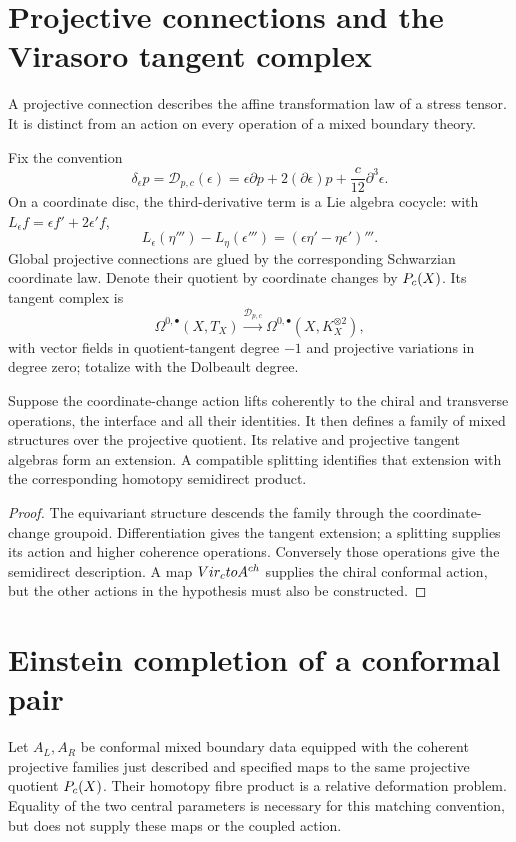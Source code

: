 \section{Projective connections and the Virasoro tangent complex}
A projective connection describes the affine transformation law of a
stress tensor. It is distinct from an action on every operation of a mixed
boundary theory.

Fix the convention
\[
 \delta_\epsilon p=\mathcal D_{p,c}(\epsilon)
   =\epsilon\partial p+2(\partial\epsilon)p+\frac c{12}\partial^3\epsilon.
\]
On a coordinate disc, the third-derivative term is a Lie algebra cocycle:
with $L_\epsilon f=\epsilon f'+2\epsilon'f$,
\[
 L_\epsilon(\eta''')-L_\eta(\epsilon''')
   =(\epsilon\eta'-\eta\epsilon')'''.
\]
Global projective connections are glued by the corresponding Schwarzian
coordinate law. Denote their quotient by coordinate changes by $P_c(X)$.
Its tangent complex is
\[
 \Omega^{0,\bullet}(X,T_X)
 \xrightarrow{\mathcal D_{p,c}}
 \Omega^{0,\bullet}(X,K_X^{\otimes2}),
\]
with vector fields in quotient-tangent degree $-1$ and projective variations
in degree zero; totalize with the Dolbeault degree.

\begin{proposition}
Suppose the coordinate-change action lifts coherently to the chiral and
transverse operations, the interface and all their identities. It then
defines a family of mixed structures over the projective quotient. Its
relative and projective tangent algebras form an extension. A compatible
splitting identifies that extension with the corresponding homotopy
semidirect product.
\end{proposition}
\begin{proof}
The equivariant structure descends the family through the coordinate-change
groupoid. Differentiation gives the tangent extension; a splitting supplies
its action and higher coherence operations. Conversely those operations
give the semidirect description. A map $Vir_cto A^{ch}$ supplies the
chiral conformal action, but the other actions in the hypothesis must also
be constructed.
\end{proof}

\section{Einstein completion of a conformal pair}
Let $A_L,A_R$ be conformal mixed boundary data equipped with the coherent
projective families just described and specified maps to the same projective
quotient $P_c(X)$. Their homotopy fibre product is a relative deformation
problem. Equality of the two central parameters is necessary for this
matching convention, but does not supply these maps or the coupled action.

